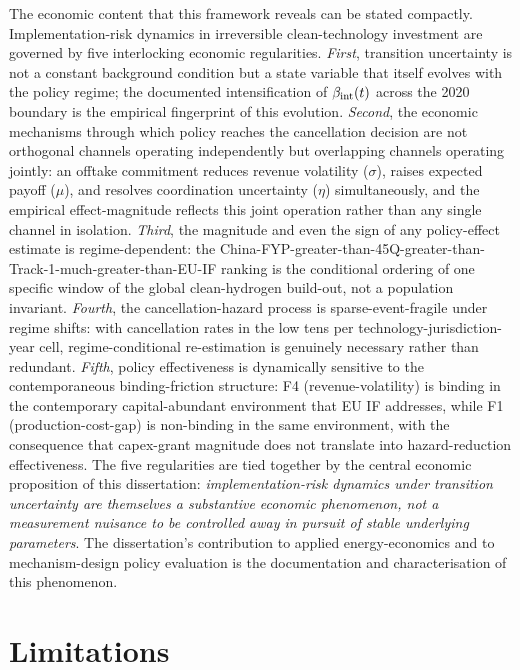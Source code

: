 The economic content that this framework reveals can be stated compactly. Implementation-risk dynamics in irreversible clean-technology investment are governed by five interlocking economic regularities. \emph{First}, transition uncertainty is not a constant background condition but a state variable that itself evolves with the policy regime; the documented intensification of $\beta_{\mathrm{int}}(t)$ across the 2020 boundary is the empirical fingerprint of this evolution. \emph{Second}, the economic mechanisms through which policy reaches the cancellation decision are not orthogonal channels operating independently but overlapping channels operating jointly: an offtake commitment reduces revenue volatility ($\sigma$), raises expected payoff ($\mu$), and resolves coordination uncertainty ($\eta$) simultaneously, and the empirical effect-magnitude reflects this joint operation rather than any single channel in isolation. \emph{Third}, the magnitude and even the sign of any policy-effect estimate is regime-dependent: the China-FYP-greater-than-45Q-greater-than-Track-1-much-greater-than-EU-IF ranking is the conditional ordering of one specific window of the global clean-hydrogen build-out, not a population invariant. \emph{Fourth}, the cancellation-hazard process is sparse-event-fragile under regime shifts: with cancellation rates in the low tens per technology-jurisdiction-year cell, regime-conditional re-estimation is genuinely necessary rather than redundant. \emph{Fifth}, policy effectiveness is dynamically sensitive to the contemporaneous binding-friction structure: F4 (revenue-volatility) is binding in the contemporary capital-abundant environment that EU IF addresses, while F1 (production-cost-gap) is non-binding in the same environment, with the consequence that capex-grant magnitude does not translate into hazard-reduction effectiveness. The five regularities are tied together by the central economic proposition of this dissertation: \emph{implementation-risk dynamics under transition uncertainty are themselves a substantive economic phenomenon, not a measurement nuisance to be controlled away in pursuit of stable underlying parameters}. The dissertation's contribution to applied energy-economics and to mechanism-design policy evaluation is the documentation and characterisation of this phenomenon.

\section{Limitations}
\label{sec:ch10-limitations}

